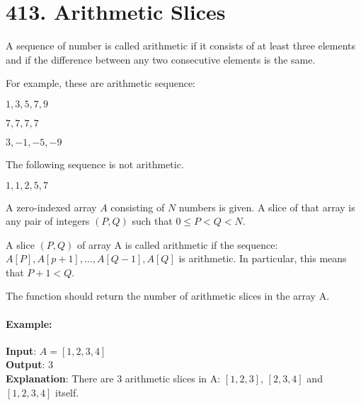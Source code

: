 \section{413. Arithmetic Slices}
A sequence of number is called arithmetic if it consists of at least three elements and if the difference between any two consecutive elements is the same.
\par
For example, these are arithmetic sequence:
\par
$1, 3, 5, 7, 9$
\par
$7, 7, 7, 7$
\par
$3, -1, -5, -9$
\par
The following sequence is not arithmetic.
\par
$1, 1, 2, 5, 7$
\par
A zero-indexed array $ A $ consisting of $ N $ numbers is given. A slice of that array is any pair of integers $(P, Q)$ such that $0 \leq P < Q < N$.
\par
A slice $(P, Q)$ of array A is called arithmetic if the sequence: $A[P], A[p + 1], \ldots, A[Q - 1], A[Q]$ is arithmetic. In particular, this means that $ P + 1 < Q $.
\par
The function should return the number of arithmetic slices in the array A.

\paragraph{Example:}
\begin{flushleft}
\textbf{Input}: $A = [1, 2, 3, 4]$
\\
\textbf{Output}: 3
\\
\textbf{Explanation}: There are 3 arithmetic slices in A: $[1, 2, 3]$, $[2, 3, 4]$ and $[1, 2, 3, 4]$ itself.
\end{flushleft}


